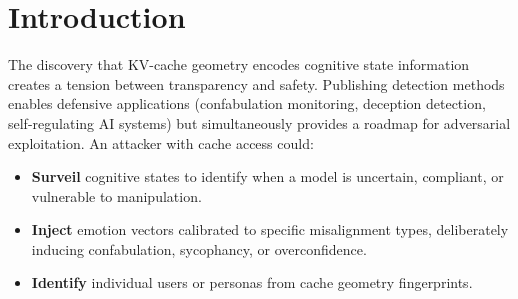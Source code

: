 \documentclass[11pt,a4paper]{article}
\begin{document}
\begin{abstract}
\begin{enumerate}
\item \textbf{A defensive Oracle Loop inside a trusted execution
environment (TEE) retains full capability.} The defender operates on the
pre-obfuscation cache, where detection (0.903) and steering function
normally. KV-Cloak protects the cache from external adversaries while
the TEE protects the obfuscation key and Oracle parameters. This is an
architectural argument, not an experimentally validated system.
\end{enumerate}

We conclude that KV-Cloak and the Oracle Loop are complementary: the
Oracle Loop provides misalignment detection and correction; KV-Cloak
prevents external adversaries from weaponizing the same geometric
methods. Together, they address the dual-use risk inherent in publishing
cache-geometry techniques. We discuss limitations including small sample
size ($n=7$ confabulations on the distilled model), marginal
cache-vs-text added value, reliance on TEE hardware trust assumptions,
underpowered injection testing, and the gap between our
orthogonal-rotation simulation and KV-Cloak's full implementation
(in-progress).

\end{abstract}

\section{Introduction}

The discovery that KV-cache geometry encodes cognitive state information
creates a tension between transparency and safety. Publishing detection
methods enables defensive applications (confabulation monitoring,
deception detection, self-regulating AI systems) but simultaneously
provides a roadmap for adversarial exploitation. An attacker with cache
access could:

\begin{itemize}
\item \textbf{Surveil} cognitive states to identify when a model is
uncertain, compliant, or vulnerable to manipulation.
\item \textbf{Inject} emotion vectors calibrated to specific
misalignment types, deliberately inducing confabulation, sycophancy, or
overconfidence.
\item \textbf{Identify} individual users or personas from cache geometry
fingerprints.
\end{itemize}
\end{document}

